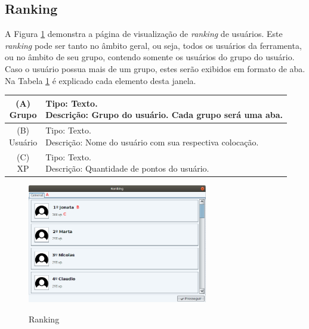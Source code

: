 \documentclass[
	12pt,				%
	oneside,			%
	a4paper,			%
	english,			%
	french,				%
	spanish,			%
	brazil,				%
	]{abntex2}
\begin{document}
\subsection{Ranking}

A Figura \ref{fig:visnodeRanking} demonstra a página de visualização de \textit{ranking} de usuários. Este \textit{ranking} pode ser tanto no âmbito geral, ou seja, todos os usuários da ferramenta, ou no âmbito de seu grupo, contendo somente os usuários do grupo do usuário. Caso o usuário possua mais de um grupo, estes serão exibidos em formato de aba. Na Tabela \ref{tab:ranking} é explicado cada elemento desta janela.

\begin{table}[H]
\centering
{} \label{tab:ranking}
\renewcommand{\arraystretch}{1.8}
\setlength{\tabcolsep}{10pt}
\begin{tabular}{|c|l|}
  \hline
  \makecell{(A) \\ Grupo} 
  &
  \makecell[l]{Tipo: Texto.\\ Descrição: Grupo do usuário. Cada grupo será uma aba.} \\
  \hline
  \makecell{(B) \\ Usuário} 
  &
  \makecell[l]{Tipo: Texto.\\ Descrição: Nome do usuário com sua respectiva colocação.} \\
  \hline
  \makecell{(C) \\ XP} 
  &
  \makecell[l]{Tipo: Texto.\\ Descrição: Quantidade de pontos do usuário.} \\
  \hline 
\end{tabular}
\centering
\sourceAuthor
\end{table}

\begin{figure}[H]
\centering
\caption{Ranking}
\includegraphics[width=0.7\textwidth]{imagens/visnode_ranking.png}
\sourceAuthor
\label{fig:visnodeRanking}
\end{figure}
\end{document}
